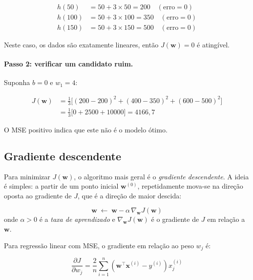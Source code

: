 \documentclass[12pt,a4paper]{article}
\begin{document}
\begin{align*}
h(50)  &= 50 + 3 \times 50 = 200 \quad (\text{erro} = 0) \\
h(100) &= 50 + 3 \times 100 = 350 \quad (\text{erro} = 0) \\
h(150) &= 50 + 3 \times 150 = 500 \quad (\text{erro} = 0)
\end{align*}

Neste caso, os dados são exatamente lineares, então $J(\mathbf{w}) = 0$ é atingível.

\paragraph{Passo 2: verificar um candidato ruim.} Suponha $b = 0$ e $w_1 = 4$:

\begin{align*}
J(\mathbf{w}) &= \frac{1}{3}\bigl[(200-200)^2 + (400-350)^2 + (600-500)^2\bigr] \\
               &= \frac{1}{3}\bigl[0 + 2500 + 10000\bigr] = 4166{,}7
\end{align*}

O MSE positivo indica que este não é o modelo ótimo.

\subsection{Gradiente descendente}
\label{subsec:gd}

Para minimizar $J(\mathbf{w})$, o algoritmo mais geral é o \emph{gradiente descendente}. A ideia é simples: a partir de um ponto inicial $\mathbf{w}^{(0)}$, repetidamente mova-se na direção oposta ao gradiente de $J$, que é a direção de maior descida:

\begin{center}
\begin{tcolorbox}[colback=boxbg, colframe=boxblue, width=0.92\textwidth]
\[
\mathbf{w} \;\leftarrow\; \mathbf{w} - \alpha \,\nabla_\mathbf{w} J(\mathbf{w})
\]
onde $\alpha > 0$ é a \emph{taxa de aprendizado} e $\nabla_\mathbf{w} J(\mathbf{w})$ é o gradiente de $J$ em relação a $\mathbf{w}$.
\end{tcolorbox}
\end{center}

Para regressão linear com MSE, o gradiente em relação ao peso $w_j$ é:

\[
\frac{\partial J}{\partial w_j} = \frac{2}{n} \sum_{i=1}^n \left(\mathbf{w}^\top \mathbf{x}^{(i)} - y^{(i)}\right) x_j^{(i)}
\]
\end{document}
